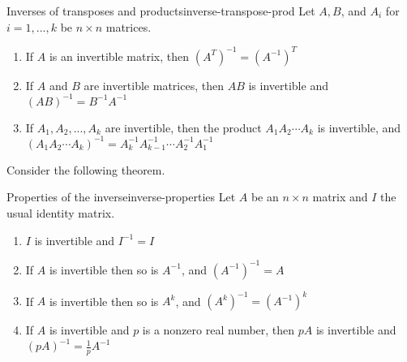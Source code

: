\begin{theorem}{Inverses of transposes and products}{inverse-transpose-prod}
Let $A, B$, and $A_i$ for $i=1,...,k$ be $n \times n$ matrices. 
\begin{enumerate}
\item
If $A$ is an invertible matrix, then $(A^{T})^{-1} = (A^{-1})^{T}$
\item
If $A$ and $B$ are invertible matrices, then $AB$ is invertible and $(AB)^{-1} = B^{-1}A^{-1}$
\item
If $A_1, A_2, ..., A_k$ are invertible, then the product $A_1A_2 \cdots A_k$ is invertible, and $(A_1A_2 \cdots A_k)^{-1} = A_k^{-1}A_{k-1}^{-1} \cdots A_2^{-1}A_1^{-1}$
\end{enumerate}
\end{theorem}

Consider the following theorem.

\begin{theorem}{Properties of the inverse}{inverse-properties}
Let $A$ be an $n \times n$ matrix and $I$ the usual identity matrix. 
\begin{enumerate}
\item
$I$ is invertible and $I^{-1} = I$
\item
If $A$ is invertible then so is $A^{-1}$, and $(A^{-1})^{-1} = A$
\item
If $A$ is invertible then so is $A^k$, and $(A^k)^{-1} = (A^{-1})^k$
\item
If $A$ is invertible and $p$ is a nonzero real number, then $pA$ is invertible and $(pA)^{-1} = \frac{1}{p}A^{-1}$
\end{enumerate}
\end{theorem}
